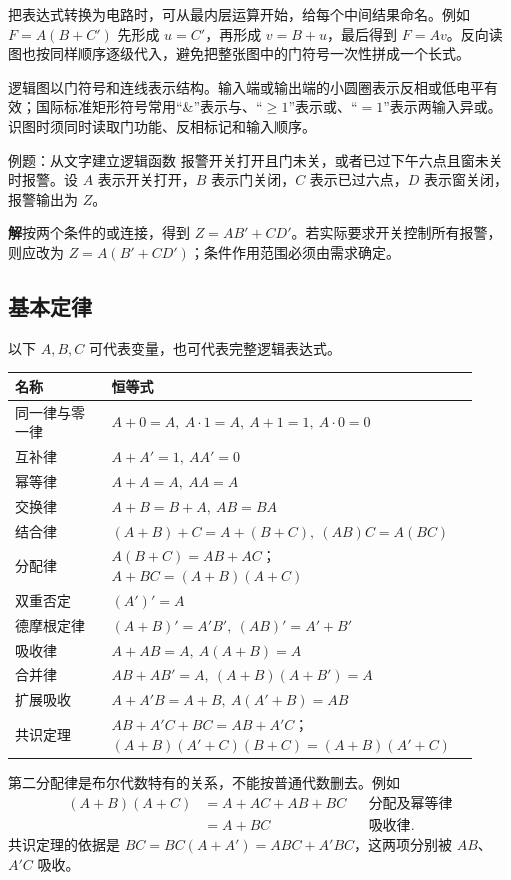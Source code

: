 \documentclass[UTF8,fontset=none,zihao=-4,a4paper]{ctexart}
\newcommand{\sol}{\par\noindent\textbf{解}\quad}
\begin{document}
把表达式转换为电路时，可从最内层运算开始，给每个中间结果命名。例如 $F=A(B+C')$ 先形成 $u=C'$，再形成 $v=B+u$，最后得到 $F=Av$。反向读图也按同样顺序逐级代入，避免把整张图中的门符号一次性拼成一个长式。

逻辑图以门符号和连线表示结构。输入端或输出端的小圆圈表示反相或低电平有效；国际标准矩形符号常用“\&”表示与、“$\ge1$”表示或、“$=1$”表示两输入异或。识图时须同时读取门功能、反相标记和输入顺序。
\begin{infobox}{例题：从文字建立逻辑函数}
报警开关打开且门未关，或者已过下午六点且窗未关时报警。设 $A$ 表示开关打开，$B$ 表示门关闭，$C$ 表示已过六点，$D$ 表示窗关闭，报警输出为 $Z$。
\end{infobox}
\sol 按两个条件的或连接，得到 $Z=AB'+CD'$。若实际要求开关控制所有报警，则应改为 $Z=A(B'+CD')$；条件作用范围必须由需求确定。

\subsection{基本定律}
以下 $A,B,C$ 可代表变量，也可代表完整逻辑表达式。
\begin{longtable}{p{0.20\linewidth}p{0.72\linewidth}}
\toprule 名称 & 恒等式\\\midrule\endhead
同一律与零一律 & $A+0=A,\ A\cdot1=A,\ A+1=1,\ A\cdot0=0$\\
互补律 & $A+A'=1,\ AA'=0$\\
幂等律 & $A+A=A,\ AA=A$\\
交换律 & $A+B=B+A,\ AB=BA$\\
结合律 & $(A+B)+C=A+(B+C),\ (AB)C=A(BC)$\\
分配律 & $A(B+C)=AB+AC$；\newline $A+BC=(A+B)(A+C)$\\
双重否定 & $(A')'=A$\\
德摩根定律 & $(A+B)'=A'B',\ (AB)'=A'+B'$\\
吸收律 & $A+AB=A,\ A(A+B)=A$\\
合并律 & $AB+AB'=A,\ (A+B)(A+B')=A$\\
扩展吸收 & $A+A'B=A+B,\ A(A'+B)=AB$\\
共识定理 & $AB+A'C+BC=AB+A'C$；\newline $(A+B)(A'+C)(B+C)=(A+B)(A'+C)$\\\bottomrule
\end{longtable}
第二分配律是布尔代数特有的关系，不能按普通代数删去。例如
\begin{align*}
(A+B)(A+C)&=A+AC+AB+BC &&\text{分配及幂等律}\\
&=A+BC &&\text{吸收律}.
\end{align*}
共识定理的依据是 $BC=BC(A+A')=ABC+A'BC$，这两项分别被 $AB$、$A'C$ 吸收。
\end{document}
